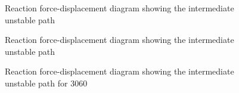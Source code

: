\documentclass[journal]{new-aiaa}
\begin{document}

\begin{figure}[!htb]
	\captionsetup[subfloat]{farskip=2pt,captionskip=2pt}
	\centering
	{
		\def\tkzscl{0.5}     
		          
	}
	\caption{Reaction force-displacement diagram showing the intermediate unstable path}
	\label{fig:rxn}
\end{figure}

\begin{figure}[!htb]
	\captionsetup[subfloat]{farskip=2pt,captionskip=2pt}
	\centering
	{
		\def\tkzscl{0.5}     
		          
	}
	\caption{Reaction force-displacement diagram showing the intermediate unstable path}
	\label{fig:rxn}
\end{figure}


\begin{figure}[!h]
	\captionsetup[subfloat]{farskip=2pt,captionskip=2pt}
	\centering
	{
		\def\tkzscl{0.6}     
		          
	}
	\caption{Reaction force-displacement diagram showing the intermediate unstable path for $3060$}
	\label{fig:rxn}
\end{figure}
\end{document}
